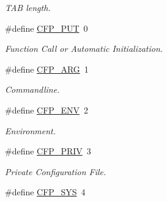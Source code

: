 \begin{CompactItemize}
\begin{CompactList}\small\item\em TAB length. \item\end{CompactList}\item 
\hypertarget{group__cflib__core_g764a8ea81ffc3940bf413797dcaf9a3d}{
\#define \hyperlink{group__cflib__core_g764a8ea81ffc3940bf413797dcaf9a3d}{CFP\_\-PUT}~0}
\label{group__cflib__core_g764a8ea81ffc3940bf413797dcaf9a3d}

\begin{CompactList}\small\item\em Function Call or Automatic Initialization. \item\end{CompactList}\item 
\hypertarget{group__cflib__core_g0901da5871f3cffeec56e491f8c9fc7f}{
\#define \hyperlink{group__cflib__core_g0901da5871f3cffeec56e491f8c9fc7f}{CFP\_\-ARG}~1}
\label{group__cflib__core_g0901da5871f3cffeec56e491f8c9fc7f}

\begin{CompactList}\small\item\em Commandline. \item\end{CompactList}\item 
\hypertarget{group__cflib__core_gc77d72299f32e91104090cdeb93f3619}{
\#define \hyperlink{group__cflib__core_gc77d72299f32e91104090cdeb93f3619}{CFP\_\-ENV}~2}
\label{group__cflib__core_gc77d72299f32e91104090cdeb93f3619}

\begin{CompactList}\small\item\em Environment. \item\end{CompactList}\item 
\hypertarget{group__cflib__core_g6cf8dcc9fa01deae5eb44698cb01f73e}{
\#define \hyperlink{group__cflib__core_g6cf8dcc9fa01deae5eb44698cb01f73e}{CFP\_\-PRIV}~3}
\label{group__cflib__core_g6cf8dcc9fa01deae5eb44698cb01f73e}

\begin{CompactList}\small\item\em Private Configuration File. \item\end{CompactList}\item 
\hypertarget{group__cflib__core_g0365a86453eeaa815a79c506343bd927}{
\#define \hyperlink{group__cflib__core_g0365a86453eeaa815a79c506343bd927}{CFP\_\-SYS}~4}
\label{group__cflib__core_g0365a86453eeaa815a79c506343bd927}


\end{CompactItemize}
